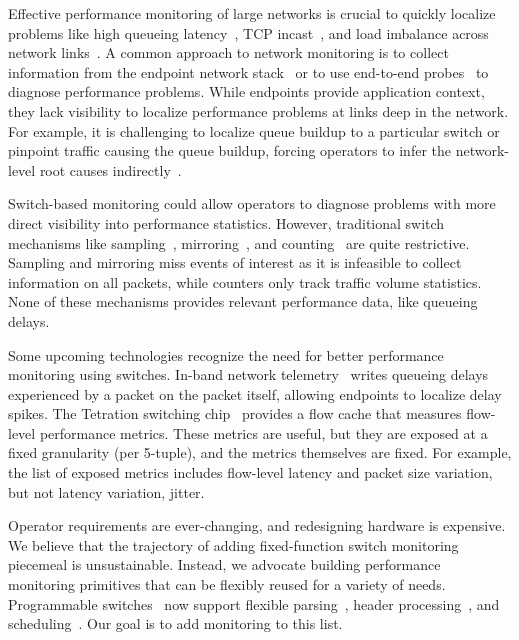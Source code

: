 Effective performance monitoring of large networks is crucial to quickly
localize problems like high queueing latency~\cite{int}, TCP
incast~\cite{tcpincast}, and load imbalance across network links~\cite{conga}.
A common approach to network monitoring is to collect information from the
endpoint network stack~\cite{minlan-snap, pathdump, trumpet} or
to use end-to-end probes~\cite{pingmesh} to diagnose performance problems.  While
endpoints provide application context, they lack visibility to localize
performance problems at links deep in the network. For example, it is
challenging to localize queue buildup to a particular switch or pinpoint
traffic causing the queue buildup, forcing operators to infer the network-level
root causes indirectly~\cite{pingmesh}.

Switch-based monitoring could allow operators to diagnose problems with more
direct visibility into performance statistics. However, traditional switch
mechanisms like sampling~\cite{netflow, sflow}, mirroring~\cite{cisco-span,
netsight, everflow}, and counting~\cite{cormode, univmon} are quite restrictive.  Sampling
and mirroring miss events of interest as it is infeasible to collect
information on all packets, while counters only track traffic volume
statistics. None of these mechanisms provides relevant performance data, like
queueing delays.

Some upcoming technologies recognize the need for better performance monitoring
using switches. In-band network telemetry~\cite{int} writes queueing delays
experienced by a packet on the packet itself, allowing endpoints to localize
delay spikes. The Tetration switching chip~\cite{tetration-telemetry} provides
a flow cache that measures flow-level performance metrics.  These metrics are
useful, but they are exposed at a fixed granularity (\eg per 5-tuple), and the metrics themselves
are fixed. For example, the list of exposed metrics includes flow-level latency
and packet size variation, but not latency variation, \ie jitter.

Operator requirements are ever-changing, and redesigning hardware is expensive.
We believe that the trajectory of adding fixed-function switch monitoring
piecemeal is unsustainable. Instead, we advocate building performance
monitoring primitives that can be flexibly reused for a variety of
needs. Programmable switches~\cite{flexpipe, tofino, xpliant} now support flexible
parsing~\cite{gibb_parsing}, header processing~\cite{rmt, domino_sigcomm}, and
scheduling~\cite{pifo_sigcomm}. Our goal is to add monitoring to this list.

